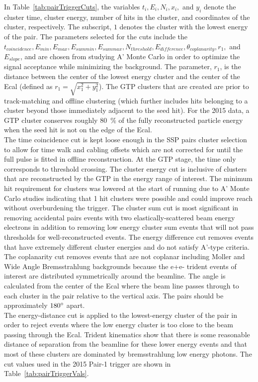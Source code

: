 In Table~\ref{tab:pairTriggerCuts}, the variables $t_i,E_i, N_i, x_i,$ and $y_i$ denote the cluster time, cluster energy, number of hits in the cluster, and coordinates of the cluster, respectively. The subscript, $1$ denotes the cluster with the lowest energy of the pair. The parameters selected for the cuts include the $t_{coincidence}, E_{min}, E_{max}, E_{sum min}, E_{sum max}, N_{threshold}, E_{difference}, \theta_{coplanarity}, r_{1},$ and $E_{slope}$, and are chosen from studying A' Monte Carlo in order to optimize the signal acceptance while minimizing the background. The parameter, $r_1$, is the distance between the center of the lowest energy cluster and the center of the Ecal (defined as $r_1=\sqrt{x_1^2+y_1^2}$). The GTP clusters that are created are prior to track-matching and offline clustering (which further includes hits belonging to a cluster beyond those immediately adjacent to the seed hit). For the 2015 data, a GTP cluster conserves roughly 80~$\%$ of the fully reconstructed particle energy when the seed hit is not on the edge of the Ecal. \\
\indent The time coincidence cut is kept loose enough in the SSP pairs cluster selection to allow for time walk and cabling offsets which are not corrected for until the full pulse is fitted in offline reconstruction. At the GTP stage, the time only corresponds to threshold crossing. The cluster energy cut is inclusive of clusters that are reconstructed by the GTP in the energy range of interest. The minimum hit requirement for clusters was lowered at the start of running due to A' Monte Carlo studies indicating that 1 hit clusters were possible and could improve reach without overburdening the trigger. The cluster sum cut is most significant in removing accidental pairs events with two elastically-scattered beam energy electrons in addition to removing low energy cluster sum events that will not pass thresholds for well-reconstructed events. The energy difference cut removes events that have extremely different cluster energies and do not satisfy A'-type criteria. \\
\indent The coplanarity cut removes events that are not coplanar including Moller and Wide Angle Bremsstrahlung backgrounds because the e+e- trident events of interest are distributed symmetrically around the beamline. The angle is calculated from the center of the Ecal where the beam line passes through to each cluster in the pair relative to the vertical axis. The pairs should be approximately $180\degree$ apart. \\
\indent The energy-distance cut is applied to the lowest-energy cluster of the pair in order to reject events where the low energy cluster is too close to the beam passing through the Ecal. Trident kinematics show that there is some reasonable distance of separation from the beamline for these lower energy events and that most of these clusters are dominated by bremsstrahlung low energy photons. 
\indent The cut values used in the 2015 Pair-1 trigger are shown in Table~\ref{tab:pairTriggerVals}.

